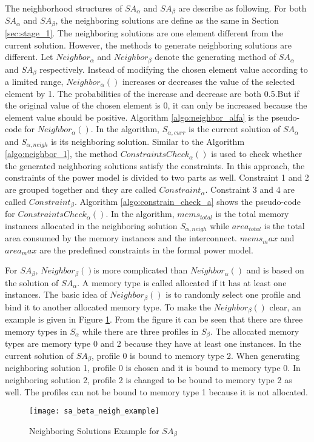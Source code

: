 	The neighborhood structures of $SA_{\alpha}$ and $SA_{\beta}$ are describe as following.
	For both $SA_{\alpha}$ and $SA_{\beta}$, the neighboring solutions are define as the same
	in Section \ref{sec:stage_1}. The neighboring solutions are one element different from the
	current solution. However, the methods to generate neighboring solutions are different.
	Let $Neighbor_{\alpha}$ and $Neighbor_{\beta}$ denote the generating method of $SA_{\alpha}$
	and $SA_{\beta}$ respectively.
	Instead of modifying the chosen element value according to a limited range, $Neighbor_{\alpha}()$
	increases or decreases the value of the selected element by 1. The probabilities of the increase
	and decrease are both 0.5.But if the original value of the chosen element is 0, it can only be
	increased because the element value should be positive.
	Algorithm \ref{algo:neighbor_alfa} is the pseudo-code for
	$Neighbor_{\alpha}()$. In the algorithm, $S_{\alpha,curr}$ is the current solution of
	$SA_{\alpha}$ and $S_{\alpha,neigh}$ is its neighboring solution. Similar to the Algorithm
	\ref{algo:neighbor_1}, the method $ConstraintsCheck_{\alpha}()$ is used to check whether the
	generated neighboring solutions satisfy the constraints.
	In this approach, the constraints of the power model is divided to two parts as well.
	Constraint 1 and 2 are grouped together and they are called $Constraint_{\alpha}$.
	Constraint 3 and 4 are called $Constraint_{\beta}$.
	Algorithm \ref{algo:constrain_check_a} shows the pseudo-code for $ConstraintsCheck_{\alpha}()$.
	In the algorithm, $mems_{total}$ is the total memory instances allocated in the neighboring
	solution $S_{\alpha,neigh}$ while $area_{total}$ is the total area consumed by the memory
	instances and the interconnect. $mems_max$ and $area_max$ are the predefined constraints in
	the formal power model.
	
	
	
	For $SA_{\beta}$, $Neighbor_{\beta}()$is more complicated than $Neighbor_{\alpha}()$ and is
	based on the solution of $SA_{\alpha}$.
	A memory type is called allocated if it has at least one instances.
	The basic idea of $Neighbor_{\beta}()$ is to randomly select one profile and bind it to another
	allocated memory type.
	To make the $Neighbor_{\beta}()$ clear, an example is given in
	Figure \ref{fig:sa_beta_neigh_example}. From the figure it can be seen that there are three
	memory types in $S_{\alpha}$ while there are three profiles in $S_{\beta}$. The allocated memory
	types are memory type 0 and 2 because they have at least one instances.
	In the current solution of $SA_{\beta}$, profile 0 is bound to
	memory type 2. When generating neighboring solution 1, profile 0 is chosen and it is bound to
	memory type 0. In neighboring solution 2, profile 2 is changed to be bound to memory type 2
	as well. The profiles can not be bound to memory type 1 because it is not allocated.
	\begin{figure}[h]
		\begin{center}
			\texttt{[image: sa\_beta\_neigh\_example]}
			\caption{Neighboring Solutions Example for $SA_{\beta}$}
			\label{fig:sa_beta_neigh_example}
		\end{center}
	\end{figure}		
	
